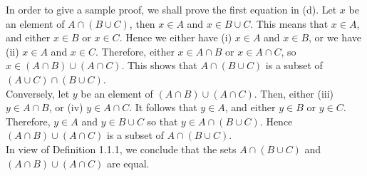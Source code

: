 In order to give a sample proof, we shall prove the first equation in (d).
Let $x$ be an element of $A\cap (B\cup C)$, then $x\in A$ and $x\in
B\cup C$.  This means that $x\in A$, and either $x\in B$ or $x\in C$.
Hence we either have (i) $x\in A$ and $x\in B$, or we have (ii) $x\in A$ and
$x\in C$. Therefore, either $x\in A\cap B$ or $x\in A\cap C$, so $x\in
(A\cap B) \cup (A\cap C)$.  This shows that $A\cap (B\cup C)$ is a
subset of $(A\cup
C)\cap (B\cup C)$.\\

Conversely, let $y$ be an element of $(A\cap B)\cup (A\cap C)$. Then,
either (iii) $y\in A\cap B$, or (iv) $y\in A\cap C$.  It follows that
$y\in A$, and either $y\in B$ or $y\in C$. Therefore, $y\in A$ and $y\in
B\cup C$ so that $y\in A \cap (B\cup C)$. Hence $(A\cap B) \cup
(A\cap C)$ is a subset of
$A\cap (B\cup C)$.\\

In view of Definition 1.1.1, we conclude that the sets $A\cap (B\cup C)$
and $(A \cap B) \cup (A\cap C)$ are equal.  
